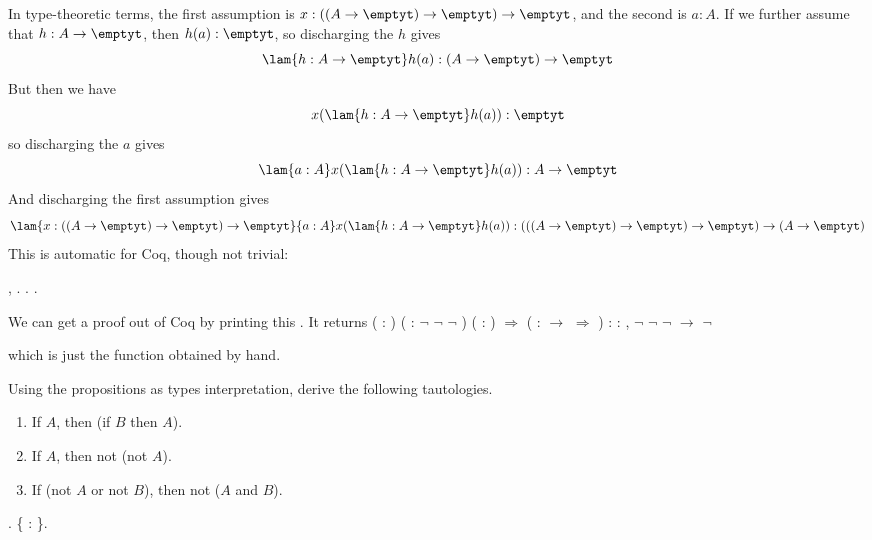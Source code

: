 In type-theoretic terms, the first assumption is $x : ((A \to \emptyt) \to
\emptyt) \to \emptyt$, and the second is $a : A$.  If we further assume that
$h : A \to \emptyt$, then $h(a) : \emptyt$, so discharging the $h$ gives
\[
\lam{h:A \to \emptyt}h(a) : (A \to \emptyt) \to \emptyt
\]
But then we have
\[
x(\lam{h : A \to \emptyt}h(a)) : \emptyt
\]
so discharging the $a$ gives
\[
\lam{a:A}x(\lam{h : A \to \emptyt}h(a)) : A \to \emptyt
\]
And discharging the first assumption gives
\[
\lam{x:((A\to\emptyt)\to\emptyt)\to\emptyt}{a:A}x(\lam{h : A \to
\emptyt}h(a)) :
(((A \to \emptyt) \to \emptyt) \to \emptyt) \to (A \to \emptyt)
\]
This is automatic for Coq, though not trivial: \begin{coqdoccode}
\coqdocemptyline
\coqdocnoindent
{} \coqdockw{\ensuremath{\forall}} , \coqdocnotation{\ensuremath{\lnot}} \coqdocnotation{\ensuremath{\lnot}} \coqdocnotation{\ensuremath{\lnot}}   \coqdocnotation{\ensuremath{\lnot}}. . .\coqdoceol
\coqdocemptyline
\end{coqdoccode}


\noindent 
We can get a proof out of Coq by printing this .  It returns
    \coqdoceol
\coqdocemptyline
\coqdocindent{2.00em}
 ( : ) ( : \ensuremath{\lnot} \ensuremath{\lnot} \ensuremath{\lnot} ) ( : ) \ensuremath{\Rightarrow}  (  :  \ensuremath{\rightarrow}  \ensuremath{\Rightarrow}  ) \coqdoceol
\coqdocindent{2.00em}
: \coqdockw{\ensuremath{\forall}}  : , \ensuremath{\lnot} \ensuremath{\lnot} \ensuremath{\lnot}  \ensuremath{\rightarrow} \ensuremath{\lnot} 

\coqdocemptyline
    \noindent
    which is just the function obtained by hand. 

    Using the propositions as types interpretation, derive the
    following tautologies.
\begin{enumerate}
\item If $A$, then (if $B$ then $A$).
\item If $A$, then not (not $A$).
\item If (not $A$ or not $B$), then not ($A$ and $B$).
\end{enumerate} \begin{coqdoccode}
\coqdocemptyline
\coqdocnoindent
{} .\coqdoceol
\coqdocindent{1.00em}
 \{  : \}.\coqdoceol
\coqdocemptyline
\end{coqdoccode}


